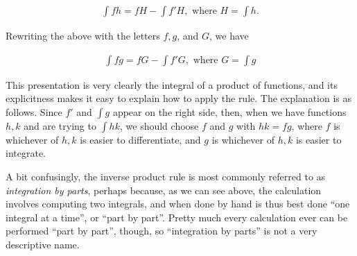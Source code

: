 \begin{align*}
	\int fh = fH - \int f'H, \text{ where } H = \int h.
\end{align*}
    
Rewriting the above with the letters $f, g$, and $G$, we have

\begin{align*}
	\boxed
	{
    	\int fg = fG - \int f'G, \text{ where } G = \int g
    }
\end{align*}
    
This presentation is very clearly the integral of a product of functions, and its explicitness makes it easy to explain how to apply the rule. The explanation is as follows. Since $f'$ and $\int g$ appear on the right side, then, when we have functions $h, k$ and are trying to $\int hk$, we should choose $f$ and $g$ with $hk = fg$, where $f$ is whichever of $h, k$ is easier to differentiate, and $g$ is whichever of $h, k$ is easier to integrate.

A bit confusingly, the inverse product rule is most commonly referred to as \textit{integration by parts}, perhaps because, as we can see above, the calculation involves computing two integrals, and when done by hand is thus best done ``one integral at a time'', or ``part by part''. Pretty much every calculation ever can be performed ``part by part'', though, so ``integration by parts'' is not a very descriptive name.